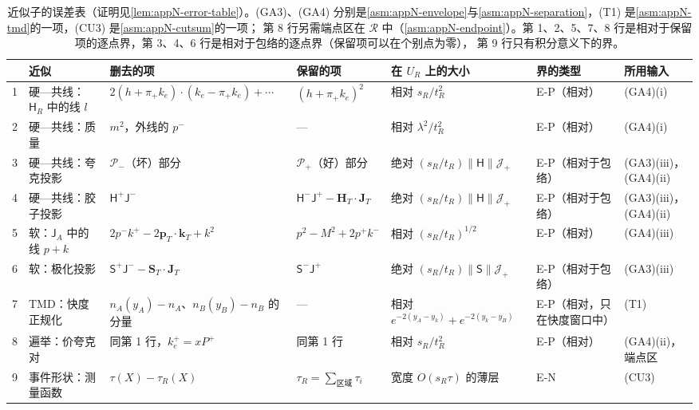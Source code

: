 \begin{table}[htbp]
\centering
\footnotesize
\renewcommand{\arraystretch}{1.12}
\setlength{\tabcolsep}{3.5pt}
\begin{tabularx}{\textwidth}{@{}c>{\raggedright\arraybackslash}p{2.3cm}>{\raggedright\arraybackslash}X>{\raggedright\arraybackslash}p{2.6cm}>{\raggedright\arraybackslash}p{2.75cm}>{\raggedright\arraybackslash}p{1.7cm}>{\raggedright\arraybackslash}p{1.6cm}@{}}
\toprule
& 近似 & 删去的项 & 保留的项 & 在 $U_R$ 上的大小 & 界的类型 & 所用输入\\
\midrule
1 & 硬—共线：$\mathsf H_R$ 中的线 $l$ & $2(h+\pi_+k_e)\cdot(k_e-\pi_+k_e)+\cdots$ & $(h+\pi_+k_e)^2$ & 相对 $s_R/t_R^2$ & E-P（相对） & (GA4)(i)\\
2 & 硬—共线：质量 & $m^2$，外线的 $p^-$ & — & 相对 $\lambda^2/t_R^2$ & E-P（相对） & (GA4)(i)\\
3 & 硬—共线：夸克投影 & $\mathcal P_-$（坏）部分 & $\mathcal P_+$（好）部分 & 绝对 $(s_R/t_R)\|\mathsf H\|\mathcal J_+$ & E-P（相对于包络） & (GA3)(iii)，(GA4)(ii)\\
4 & 硬—共线：胶子投影 & $\mathsf H^+\mathsf J^-$ & $\mathsf H^-\mathsf J^+-\mathbf H_T\cdot\mathbf J_T$ & 绝对 $(s_R/t_R)\|\mathsf H\|\mathcal J_+$ & E-P（相对于包络） & (GA3)(iii)，(GA4)(ii)\\
5 & 软：$\mathsf J_A$ 中的线 $p+k$ & $2p^-k^+-2\mathbf p_T\cdot\mathbf k_T+k^2$ & $p^2-M^2+2p^+k^-$ & 相对 $(s_R/t_R)^{1/2}$ & E-P（相对） & (GA4)(iii)\\
6 & 软：极化投影 & $\mathsf S^+\mathsf J^--\mathbf S_T\cdot\mathbf J_T$ & $\mathsf S^-\mathsf J^+$ & 绝对 $(s_R/t_R)\|\mathsf S\|\mathcal J_+$ & E-P（相对于包络） & (GA3)(iii)\\
7 & TMD：快度正规化 & $n_A(y_A)-n_A$、$n_B(y_B)-n_B$ 的分量 & — & 相对 $e^{-2(y_A-y_k)}+e^{-2(y_k-y_B)}$ & E-P（相对，只在快度窗口中） & (T1)\\
8 & 遍举：价夸克对 & 同第 1 行，$k_e^+=xP^+$ & 同第 1 行 & 相对 $s_R/t_R^2$ & E-P（相对） & (GA4)(ii)，端点区\\
9 & 事件形状：测量函数 & $\tau(X)-\tau_R(X)$ & $\tau_R=\sum_{\text{区域}}\tau_i$ & 宽度 $O(s_R\tau)$ 的薄层 & E-N & (CU3)\\
\bottomrule
\end{tabularx}
\caption{近似子的误差表（证明见\cref{lem:appN-error-table}）。(GA3)、(GA4) 分别是\cref{asm:appN-envelope}与\cref{asm:appN-separation}，(T1) 是\cref{asm:appN-tmd}的一项，(CU3) 是\cref{asm:appN-cutsum}的一项；
第 8 行另需端点区在 $\mathcal R$ 中（\cref{asm:appN-endpoint}）。第 1、2、5、7、8 行是相对于保留项的逐点界，第 3、4、6 行是相对于包络的逐点界（保留项可以在个别点为零），
第 9 行只有积分意义下的界。}
\label{tab:method-errors}
\end{table}

